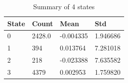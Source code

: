 \documentclass[a4paper,12pt]{article}
\begin{document}
\begin{table}[H]
    \centering
    \begin{tabular}{|l|l|l|l|}
    \hline
    State & Count  & Mean                           & Std                           \\ \hline
    0     & 2428.0 & -0.004335                      & \multicolumn{1}{r|}{1.946686} \\ \hline
    1     & 394    & 0.013764                       & 7.281018                      \\ \hline
    2     & 218    & \multicolumn{1}{r|}{-0.023388} & 7.635582                      \\ \hline
    3     & 4379   & 0.002953                       & \multicolumn{1}{r|}{1.759820} \\ \hline
    \end{tabular}
    \caption{Summary of 4 states}
    \label{table_4states}
\end{table}




\end{document}
